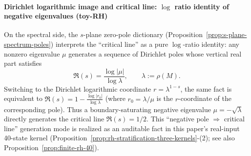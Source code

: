 \paragraph{Dirichlet logarithmic image and critical line: \texorpdfstring{$\log$}{log} ratio identity of negative eigenvalues (toy-RH)}
On the spectral side, the \(s\)-plane zero-pole dictionary (Proposition~\ref{prop:s-plane-spectrum-poles}) interprets the ``critical line'' as a pure \(\log\)-ratio identity: any nonzero eigenvalue \(\mu\) generates a sequence of Dirichlet poles whose vertical real part satisfies
\[
\Re(s)=\frac{\log|\mu|}{\log\lambda},
\qquad \lambda:=\rho(M).
\]
Switching to the Dirichlet logarithmic coordinate \(r=\lambda^{1-s}\), the same fact is equivalent to
\(
\Re(s)=1-\frac{\log|r_0|}{\log\lambda}
\)
(where \(r_0=\lambda/\mu\) is the \(r\)-coordinate of the corresponding pole).
Thus a boundary-saturating negative eigenvalue \(\mu=-\sqrt{\lambda}\) directly generates the critical line \(\Re(s)=1/2\).
This ``negative pole \(\Rightarrow\) critical line'' generation mode is realized as an auditable fact in this paper's real-input 40-state kernel (Proposition~\ref{prop:rh-stratification-three-kernels}-(2); see also Proposition~\ref{prop:finite-rh-40}).

